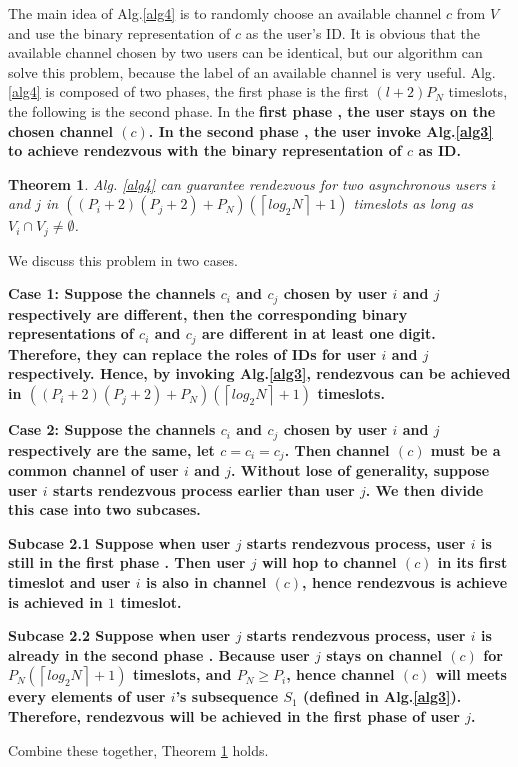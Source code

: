 \documentclass[10pt, conference, letterpaper]{IEEEtran}
\newtheorem{theorem}{Theorem}
\begin{document}
The main idea of Alg.\ref{alg4} is to randomly choose an available channel $c$ from $V$ and use the binary representation of $c$ as the user's ID. It is obvious that the available channel chosen by two users can be identical, but our algorithm can solve this problem, because the label of an available channel is very useful. Alg.\ref{alg4} is composed of two phases, the first phase is the first $(l+2)P_N$ timeslots, the following is the second phase.
In the \bfseries first phase \mdseries, the user stays on the chosen channel $(c)$. In the \bfseries second phase \mdseries, the user invoke Alg.\ref{alg3} to achieve rendezvous with the binary representation of $c$ as ID.



\begin{theorem}
\label{theo-alg4}
Alg. \ref{alg4} can guarantee rendezvous for two asynchronous users $i$ and $j$ in $((P_i +2)(P_j+2)+P_N)(\left \lceil log_2 N \right \rceil + 1)$ timeslots as long as $V_i \cap V_j \ne \emptyset$.
\end{theorem}

\begin{IEEEproof}

We discuss this problem in two cases.

\bfseries Case 1: \mdseries Suppose the channels $c_i$ and $c_j$ chosen by user $i$ and $j$ respectively are different, then the corresponding binary representations of $c_i$ and $c_j$ are different in at least one digit. Therefore, they can replace the roles of IDs for user $i$ and $j$ respectively. Hence, by invoking Alg.\ref{alg3}, rendezvous can be achieved in $((P_i +2)(P_j+2)+P_N)(\left \lceil log_2 N \right \rceil + 1)$ timeslots.

\bfseries Case 2: \mdseries Suppose the channels $c_i$ and $c_j$ chosen by user $i$ and $j$ respectively are the same, let $c = c_i = c_j$. Then channel $(c)$ must be a common channel of user $i$ and $j$. Without lose of generality, suppose user $i$ starts rendezvous process earlier than user $j$. We then divide this case into two subcases.

\bfseries Subcase 2.1 \mdseries Suppose when user $j$ starts rendezvous process, user $i$ is still in the \bfseries first phase \mdseries.
Then user $j$ will hop to channel $(c)$ in its first timeslot and user $i$ is also in channel $(c)$, hence rendezvous is achieve is achieved in $1$ timeslot.

\bfseries Subcase 2.2 \mdseries Suppose when user $j$ starts rendezvous process, user $i$ is already in the \bfseries second phase \mdseries. Because  user $j$ stays on channel $(c)$ for $P_N(\left \lceil log_2 N \right \rceil + 1)$ timeslots, and $P_N \ge P_i$, hence channel $(c)$ will meets every elements of user $i$'s subsequence $S_1$ (defined in Alg.\ref{alg3}). Therefore, rendezvous will be achieved in the \bfseries first phase \mdseries of user $j$.

Combine these together, Theorem \ref{theo-alg4} holds.

\end{IEEEproof}
\end{document}
